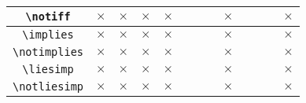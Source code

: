 \documentclass[12pt,a4paper]{article}
\begin{document}
\begin{table}[h]
\begin{center}
\begin{tabular}{c|c|c|c|c|c|c|c|c|c|c|c|c}
            \hline \verb+\notiff+ & $\times$ & $\times$ & $\times$ & $\times$ &          &          &          & $\times$ &          &          &          & $\times$ \\
            \hline \verb+\implies+ & $\times$ & $\times$ & $\times$ & $\times$ &          &          &          & $\times$ &          &          &          & $\times$ \\
            \hline \verb+\notimplies+ & $\times$ & $\times$ & $\times$ & $\times$ &          &          &          & $\times$ &          &          &          & $\times$ \\
            \hline \verb+\liesimp+ & $\times$ & $\times$ & $\times$ & $\times$ &          &          &          & $\times$ &          &          &          & $\times$ \\
            \hline \verb+\notliesimp+ & $\times$ & $\times$ & $\times$ & $\times$ &          &          &          & $\times$ &          &          &          & $\times$ \\
        \end{tabular}
    \end{center}
    \label{table:decorations-operators}
\end{table}


\end{document}
